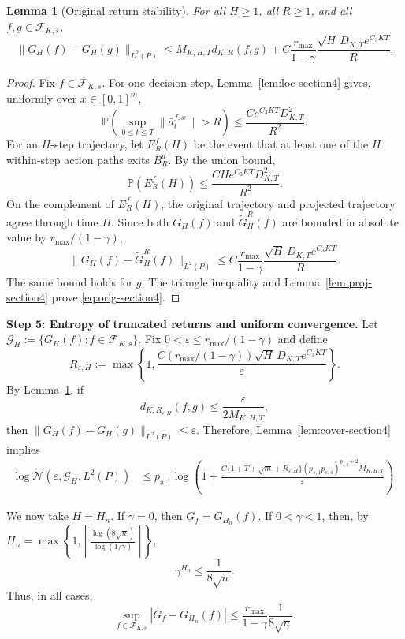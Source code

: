 \documentclass{article}
\newtheorem{lem}[thm]{Lemma}
\newcommand{\1}{\mathbbm{1}}
\numberwithin{equation}{section}
\begin{document}
\begin{lem}[Original return stability]
\label{lem:orig-section4}
For all \(H\ge1\), all \(R\ge1\), and all \(f,g\in\mathcal F_{K,s}\),
\begin{equation}
\label{eq:orig-section4}
 \|G_H(f)-G_H(g)\|_{L^2(P)}
 \le
 M_{K,H,T}d_{K,R}(f,g)
 +C\frac{r_{\max}}{1-\gamma}
 \frac{\sqrt H\,D_{K,T}e^{C_3KT}}{R}.
\end{equation}
\end{lem}

\begin{proof}
Fix \(f\in\mathcal F_{K,s}\). For one decision step, Lemma~\ref{lem:loc-section4} gives, uniformly over \(x\in[0,1]^m\),
\[
 \mathbb P\left(\sup_{0\le t\le T}\|\bar a_t^{f,x}\|>R\right)
 \le
 \frac{Ce^{C_3KT}D_{K,T}^2}{R^2}.
\]
For an \(H\)-step trajectory, let \(E_R^f(H)\) be the event that at least one of the \(H\) within-step action paths exits \(B_R^d\). By the union bound,
\[
 \mathbb P(E_R^f(H))\le \frac{CHe^{C_3KT}D_{K,T}^2}{R^2}.
\]
On the complement of \(E_R^f(H)\), the original trajectory and projected trajectory agree through time \(H\). Since both \(G_H(f)\) and \(\widetilde G_H^R(f)\) are bounded in absolute value by \(r_{\max}/(1-\gamma)\),
\[
 \|G_H(f)-\widetilde G_H^R(f)\|_{L^2(P)}
 \le
 C\frac{r_{\max}}{1-\gamma}
 \frac{\sqrt H\,D_{K,T}e^{C_3KT}}{R}.
\]
The same bound holds for \(g\). The triangle inequality and Lemma~\ref{lem:proj-section4} prove \eqref{eq:orig-section4}.
\end{proof}

\medskip
\noindent\textbf{Step 5: Entropy of truncated returns and uniform convergence.}
Let \(\mathcal G_H:=\{G_H(f):f\in\mathcal F_{K,s}\}\). Fix \(0<\varepsilon\le r_{\max}/(1-\gamma)\) and define
\begin{equation}
\label{eq:Reps-section4}
 R_{\varepsilon,H}:=
 \max\left\{1,\frac{C(r_{\max}/(1-\gamma))\sqrt H\,D_{K,T}e^{C_3KT}}{\varepsilon}\right\}.
\end{equation}
By Lemma~\ref{lem:orig-section4}, if
\[
 d_{K,R_{\varepsilon,H}}(f,g)
 \le
 \frac{\varepsilon}{2M_{K,H,T}},
\]
then \(\|G_H(f)-G_H(g)\|_{L^2(P)}\le\varepsilon\). Therefore, Lemma~\ref{lem:cover-section4} implies
\begin{align}
\label{eq:GHcover-section4}
 \log \mathcal N(\varepsilon,\mathcal G_H,L^2(P))
 &\le
 p_{s,1}\log\left(
 1+
 \frac{
 C\{1+T+\sqrt m+R_{\varepsilon,H}\}(p_{s,1}p_{s,4})^{p_{s,2}+2}M_{K,H,T}
 }{\varepsilon}
 \right).
\end{align}

We now take \(H=H_n\). If \(\gamma=0\), then \(G_f=G_{H_n}(f)\). If \(0<\gamma<1\), then, by $H_n
=
\max\left\{
1,
\left\lceil
\frac{\log(8\sqrt n)}{\log(1/\gamma)}
\right\rceil
\right\}$,
\[
 \gamma^{H_n}\le \frac1{8\sqrt n}.
\]
Thus, in all cases,
\begin{equation}
\label{eq:disc-trunc-section4}
 \sup_{f\in\mathcal F_{K,s}}|G_f-G_{H_n}(f)|
 \le
 \frac{r_{\max}}{1-\gamma}\frac1{8\sqrt n}.
\end{equation}
\end{document}
